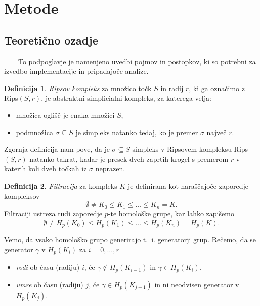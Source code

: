 \documentclass[a4paper,11pt]{article}
\theoremstyle{definition}
\newtheorem*{definicija}{Definicija}
\theoremstyle{plain}
\begin{document}
\section{Metode}


\subsection{Teoretično ozadje}

\ \ \ \
To podpoglavje je namenjeno uvedbi pojmov in postopkov, ki so potrebni za izvedbo implementacije in pripadajoče analize.

\begin{definicija}
    \textit{Ripsov kompleks} za množico točk $S$ in radij $r$, ki ga označimo z Rips$(S, r)$, je abstraktni simplicialni kompleks, za katerega velja:
    \begin{itemize}
        \item množica oglišč je enaka množici $S$,
        \item podmnožica $\sigma \subseteq S$ je simpleks natanko tedaj, ko je premer $\sigma$ največ $r$.
    \end{itemize}
\end{definicija}

Zgornja definicija nam pove, da je $\sigma \subseteq S$ simpleks v Ripsovem kompleksu Rips$(S, r)$ natanko takrat, 
kadar je presek dveh zaprtih krogel s premerom $r$ v katerih koli dveh točkah iz $\sigma$ neprazen.

\begin{definicija}
    \textit{Filtracija} za kompleks $K$ je definirana kot naraščajoče zaporedje kompleksov
    $$
    \emptyset \neq K_0 \leq K_1 \leq \ldots \leq K_n = K.
    $$
    Filtraciji ustreza tudi zaporedje $p$-te homološke grupe, kar lahko zapišemo
    $$
    \emptyset \neq H_p(K_0) \leq H_p(K_1) \leq \ldots \leq H_p(K_n) = H_p(K).
    $$
\end{definicija}
\noindent
Vemo, da vsako homološko grupo generirajo t.~i. generatorji grup. Rečemo, da se generator $\gamma$ v $H_p(K_i)$ za $i = 0, \ldots, r$
\begin{itemize}
    \item \textit{rodi} ob času (radiju) $i$, če $\gamma \notin H_p(K_{i-1})$ in $\gamma \in H_p(K_i)$,
    \item \textit{umre} ob času (radiju) $j$, če $\gamma \in H_p(K_{j - 1})$ in ni neodvisen generator v $H_p(K_j)$.
\end{itemize}
\end{document}
